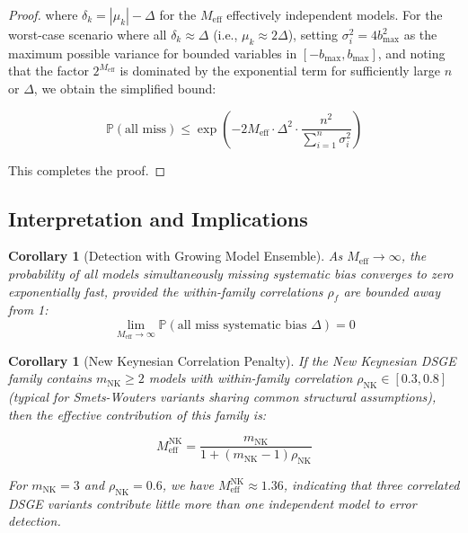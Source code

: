 \documentclass[12pt,a4paper]{article}
\newtheorem{corollary}[theorem]{Corollary}
\begin{document}
\begin{proof}
where $\delta_k = |\mu_k| - \Delta$ for the $M_{\text{eff}}$ effectively
independent models.  For the worst-case scenario where all $\delta_k
\approx \Delta$ (i.e., $\mu_k \approx 2\Delta$), setting
$\sigma_i^2 = 4b_{\max}^2$ as the maximum possible variance for
bounded variables in $[-b_{\max}, b_{\max}]$, and noting that the
factor $2^{M_{\text{eff}}}$ is dominated by the exponential term
for sufficiently large $n$ or $\Delta$, we obtain the simplified bound:

\begin{equation}
    \mathbb{P}(\text{all miss}) \leq
    \exp\left(-2 M_{\text{eff}} \cdot \Delta^2 \cdot
    \frac{n^2}{\sum_{i=1}^n \sigma_i^2}\right) \label{eq:final_bound}
\end{equation}

This completes the proof.
\end{proof}

\subsection{Interpretation and Implications}

\begin{corollary}[Detection with Growing Model Ensemble]
\label{cor:growing}
As $M_{\text{eff}} \to \infty$, the probability of all models
simultaneously missing systematic bias converges to zero exponentially
fast, provided the within-family correlations $\rho_f$ are bounded away
from 1:
\begin{equation}
    \lim_{M_{\text{eff}} \to \infty}
    \mathbb{P}(\text{all miss systematic bias } \Delta) = 0
    \label{eq:limit_detection}
\end{equation}
\end{corollary}

\begin{corollary}[New Keynesian Correlation Penalty]
\label{cor:nk_penalty}
If the New Keynesian DSGE family contains $m_{\text{NK}} \geq 2$ models
with within-family correlation $\rho_{\text{NK}} \in [0.3, 0.8]$ (typical
for Smets-Wouters variants sharing common structural assumptions), then
the effective contribution of this family is:

\begin{equation}
    M_{\text{eff}}^{\text{NK}} = \frac{m_{\text{NK}}}
    {1 + (m_{\text{NK}} - 1)\rho_{\text{NK}}}
    \label{eq:nk_penalty}
\end{equation}

For $m_{\text{NK}} = 3$ and $\rho_{\text{NK}} = 0.6$, we have
$M_{\text{eff}}^{\text{NK}} \approx 1.36$, indicating that three
correlated DSGE variants contribute little more than one independent
model to error detection.
\end{corollary}
\end{document}
